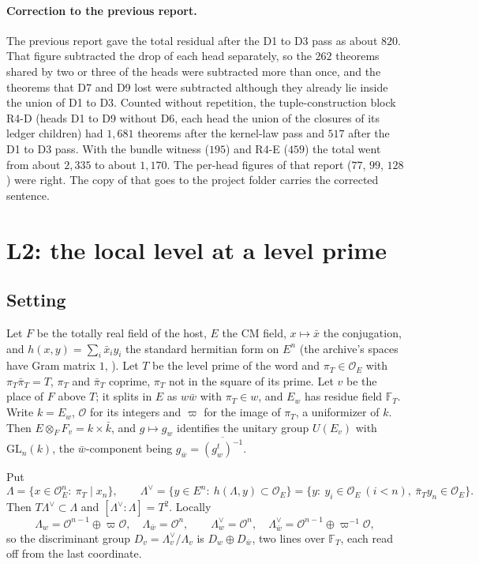\documentclass[11pt]{article}
\newcommand{\OEr}{\mathcal O_E}
\newcommand{\Ok}{\mathcal O}
\newcommand{\GL}{\mathrm{GL}}
\newcommand{\Lb}{\Lambda}
\newcommand{\Lbd}{\Lambda^{\vee}}
\theoremstyle{definition}
\theoremstyle{remark}
\begin{document}
\paragraph{Correction to the previous report.} The previous report gave the total residual after the D1 to D3 pass as about $820$. That figure subtracted the drop of each head separately, so the $262$ theorems shared by two or three of the heads were subtracted more than once, and the theorems that D7 and D9 lost were subtracted although they already lie inside the union of D1 to D3. Counted without repetition, the tuple-construction block R4-D (heads D1 to D9 without D6, each head the union of the closures of its ledger children) had $1{,}681$ theorems after the kernel-law pass and $517$ after the D1 to D3 pass. With the bundle witness ($195$) and R4-E ($459$) the total went from about $2{,}335$ to about $1{,}170$. The per-head figures of that report ($77$, $99$, $128$) were right. The copy of  that goes to the project folder carries the corrected sentence.

\section{L2: the local level at a level prime}\label{sec:L2}

\subsection{Setting}
Let $F$ be the totally real field of the host, $E$ the CM field, $x\mapsto\bar x$ the conjugation, and $h(x,y)=\sum_i\bar x_iy_i$ the standard hermitian form on $E^n$ (the archive's spaces have Gram matrix $1$, ). Let $T$ be the level prime of the word and $\pi_T\in\OEr$ with $\pi_T\bar\pi_T=T$, $\pi_T$ and $\bar\pi_T$ coprime, $\pi_T$ not in the square of its prime. Let $v$ be the place of $F$ above $T$; it splits in $E$ as $w\bar w$ with $\pi_T\in w$, and $E_w$ has residue field $\mathbb F_T$. Write $k=E_w$, $\Ok$ for its integers and $\varpi$ for the image of $\pi_T$, a uniformizer of $k$. Then $E\otimes_FF_v=k\times\bar k$, and $g\mapsto g_w$ identifies the unitary group $U(E_v)$ with $\GL_n(k)$, the $\bar w$-component being $g_{\bar w}=\overline{(g_w^{t})^{-1}}$.

Put
\[
\Lb=\{x\in\OEr^{n}:\ \pi_T\mid x_n\},\qquad \Lbd=\{y\in E^n:\ h(\Lb,y)\subset\OEr\}=\{y:\ y_i\in\OEr\ (i<n),\ \bar\pi_Ty_n\in\OEr\}.
\]
Then $T\Lbd\subset\Lb$ and $[\Lbd:\Lb]=T^2$. Locally
\[
\Lb_w=\Ok^{n-1}\oplus\varpi\Ok,\quad \Lb_{\bar w}=\Ok^{n},\qquad \Lbd_w=\Ok^{n},\quad \Lbd_{\bar w}=\Ok^{n-1}\oplus\varpi^{-1}\Ok,
\]
so the discriminant group $D_v=\Lbd_v/\Lb_v$ is $D_w\oplus D_{\bar w}$, two lines over $\mathbb F_T$, each read off from the last coordinate.
\end{document}
